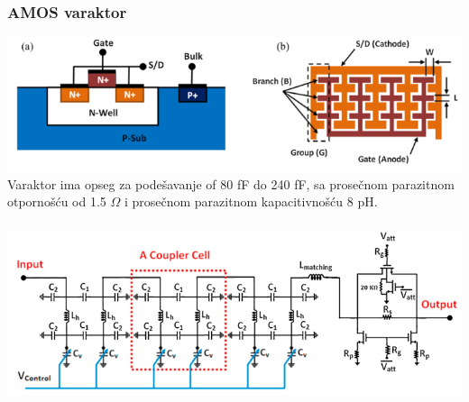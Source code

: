 \documentclass{beamer}
\begin{document}
\begin{frame}
\frametitle{AMOS varaktor}
    \includegraphics[width=\textwidth]{amos_varactor.png}
    Varaktor ima opseg za podešavanje of 80 fF do 240 fF, sa prosečnom parazitnom otpornošću od 1.5 $\Omega$ i prosečnom parazitnom kapacitivnošću 8 pH.

\end{frame}




\begin{frame}
  \frametitle{}
  \includegraphics[width=\textwidth]{proposed_sch_coupler_cells_attenuator.png}

\end{frame}
\end{document}
